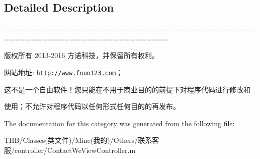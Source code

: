 \subsection{Detailed Description}
============================================================================

版权所有 2013-\/2016 方诺科技，并保留所有权利。

网站地址\+: \href{http://www.fnuo123.com}{\tt http\+://www.\+fnuo123.\+com}； 



这不是一个自由软件！您只能在不用于商业目的的前提下对程序代码进行修改和

使用；不允许对程序代码以任何形式任何目的的再发布。 

 

The documentation for this category was generated from the following file\+:\begin{DoxyCompactItemize}
\item 
T\+H\+B/\+Classes(类文件)/\+Mine(我的)/\+Others/联系客服/controller/Contact\+We\+View\+Controller.\+m\end{DoxyCompactItemize}
